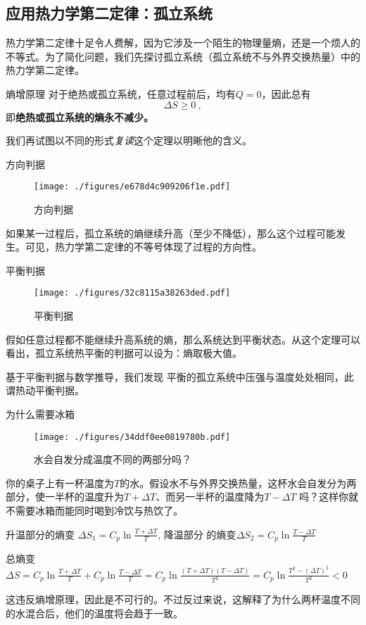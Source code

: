 \subsection{应用热力学第二定律：孤立系统}
热力学第二定律十足令人费解，因为它涉及一个陌生的物理量熵，还是一个烦人的不等式。为了简化问题，我们先探讨孤立系统（孤立系统不与外界交换热量）中的热力学第二定律。
\begin{corollary}{熵增原理}
对于绝热或孤立系统，任意过程前后，均有$Q=0$，因此总有 $$\Delta S \ge 0~,$$
即\textbf{绝热或孤立系统的熵永不减少。}
\end{corollary}
我们再试图以不同的形式\textsl{复读}这个定理以明晰他的含义。

\begin{corollary}{方向判据}
\begin{figure}[ht]
\centering
\texttt{[image: ./figures/e678d4c909206f1e.pdf]}
\caption{方向判据} \label{fig_Td2Law_1}
\end{figure}
如果某一过程后，孤立系统的熵继续升高（至少不降低），那么这个过程可能发生。可见，热力学第二定律的不等号体现了过程的方向性。
\end{corollary}

\begin{corollary}{平衡判据}
\begin{figure}[ht]
\centering
\texttt{[image: ./figures/32c8115a38263ded.pdf]}
\caption{平衡判据} \label{fig_Td2Law_2}
\end{figure}
假如任意过程都不能继续升高系统的熵，那么系统达到平衡状态。从这个定理可以看出，孤立系统热平衡的判据可以设为：熵取极大值。

基于平衡判据与数学推导，我们发现 平衡的孤立系统中压强与温度处处相同，此谓热动平衡判据。
\end{corollary}

\begin{example}{为什么需要冰箱}
\begin{figure}[ht]
\centering
\texttt{[image: ./figures/34ddf0ee0819780b.pdf]}
\caption{水会自发分成温度不同的两部分吗？} \label{fig_Td2Law_5}
\end{figure}
你的桌子上有一杯温度为$T$的水。假设水不与外界交换热量，这杯水会自发分为两部分，使一半杯的温度升为$T+\Delta T$、而另一半杯的温度降为$T-\Delta T$ 吗？这样你就不需要冰箱而能同时喝到冷饮与热饮了。

升温部分的熵变 $\Delta S_1=C_p \ln \frac{T+\Delta T}{T}$, 降温部分 的熵变$\Delta S_2=C_p \ln \frac{T-\Delta T}{T}$

总熵变 $\Delta S = C_p \ln \frac{T+\Delta T}{T} + C_p \ln \frac{T-\Delta T}{T} = C_p \ln \frac{(T+\Delta T)(T-\Delta T)}{T^2}= C_p \ln \frac{T^2 - (\Delta T)^2}{T^2}<0$

这违反熵增原理，因此是不可行的。不过反过来说，这解释了为什么两杯温度不同的水混合后，他们的温度将会趋于一致。
\end{example}


